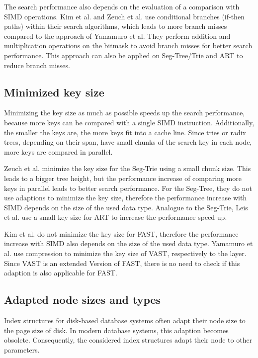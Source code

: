 \documentclass[conference]{IEEEtran}
\begin{document}
The search performance also depends on the evaluation of a comparison with SIMD operations. Kim et al. and Zeuch et al. use conditional branches (if-then paths) within their search algorithms, which leads to more branch misses compared to the approach of Yamamuro et al. They perform addition and multiplication operations on the bitmask to avoid branch misses for better search performance. This approach can also be applied on Seg-Tree/Trie and ART to reduce branch misses.

\subsection{Minimized key size}
Minimizing the key size as much as possible speeds up the search performance, because more keys can be compared with a single SIMD instruction. Additionally, the smaller the keys are, the more keys fit into a cache line. Since tries or radix trees, depending on their span, have small chunks of the search key in each node, more keys are compared in parallel.

Zeuch et al. minimize the key size for the Seg-Trie using a small chunk size. This leads to a bigger tree height, but the performance increase of comparing more keys in parallel leads to better search performance. For the Seg-Tree, they do not use adaptions to minimize the key size, therefore the performance increase with SIMD depends on the size of the used data type. Analogue to the Seg-Trie, Leis et al. use a small key size for ART to increase the performance speed up.

Kim et al. do not minimize the key size for FAST, therefore the performance increase with SIMD also depends on the size of the used data type. Yamamuro et al. use compression to minimize the key size of VAST, respectively to the layer. Since VAST is an extended Version of FAST, there is no need to check if this adaption is also applicable for FAST. 


\subsection{Adapted node sizes and types}
Index structures for disk-based database systems often adapt their node size to the page size of disk. In modern database systems, this adaption becomes obsolete. Consequently, the considered index structures adapt their node to other parameters. 
\end{document}
